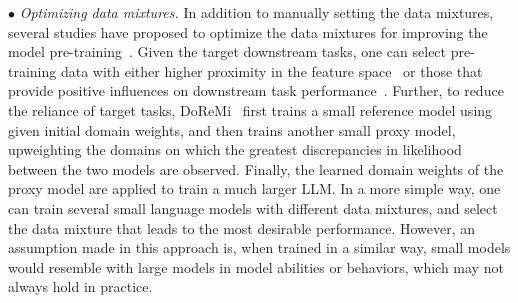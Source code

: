 $\bullet$ \emph{Optimizing data mixtures.} In addition to manually setting the data mixtures, several studies have proposed to optimize the data mixtures for improving the model pre-training~\cite{Xie-arxiv-2023-DSIR,Xie-arxiv-2023-doremi}. Given the target downstream tasks, one can select pre-training data with either higher proximity in the feature space~\cite{Xie-arxiv-2023-DSIR} or those that provide positive influences on downstream  task performance~\cite{Wang-2023-arXiv-farewell}. Further, to reduce the reliance of target tasks, DoReMi~\cite{Xie-arxiv-2023-doremi} first trains a small reference model using   given initial domain weights, and then trains another small proxy model, upweighting the domains   on which the greatest discrepancies in  likelihood between the two models are observed. Finally, the learned  domain weights of the proxy model are applied to train a much larger LLM. In a more simple way, one can train several small  language models with different data mixtures, and select the data mixture that leads to  the most desirable performance. However, an assumption made in this  approach is,   when trained in a similar way,  small models would resemble with large models in model abilities or behaviors, which may not always hold in practice. 


